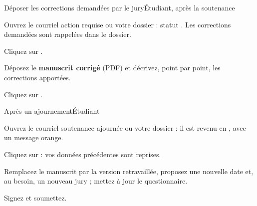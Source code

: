 \documentclass[11pt,a4paper]{article}
\begin{document}
\begin{procedure}{Déposer les corrections demandées par le jury}{Étudiant, après la soutenance}
\begin{etapes}
  \item Ouvrez le courriel \og action requise\fg{} ou votre dossier : statut
        . Les corrections demandées
        sont rappelées dans le dossier.
  \item Cliquez sur .
  \item Déposez le \textbf{manuscrit corrigé} (PDF) et décrivez, point par
        point, les corrections apportées.
  \item Cliquez sur .
\end{etapes}
\end{procedure}




\begin{procedure}{Après un ajournement}{Étudiant}
\begin{etapes}
  \item Ouvrez le courriel \og soutenance ajournée\fg{} ou votre dossier : il
        est revenu en , avec un message orange.
  \item Cliquez sur  : vos données
        précédentes sont reprises.
  \item Remplacez le manuscrit par la version retravaillée, proposez une
        nouvelle date et, au besoin, un nouveau jury ; mettez à jour le
        questionnaire.
  \item Signez et soumettez.
\end{etapes}
\end{procedure}
\end{document}
